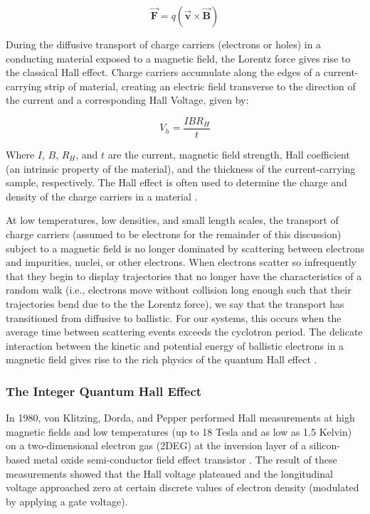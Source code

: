 \begin{equation}
\vec{\mathbf{F}} = q(\vec{\mathbf{v}} \times \vec{\mathbf{B}})
\end{equation}

During the diffusive transport of charge carriers (electrons or holes) in a conducting material exposed to a magnetic field, the Lorentz force gives rise to the classical Hall effect. Charge carriers accumulate along the edges of a current-carrying strip of material, creating an electric field transverse to the direction of the current and a corresponding Hall Voltage, given by:

\begin{equation}
V_{h} = \frac{I B R_{H}}{t}
\end{equation}

Where $I$,  $B$, $R_{H}$, and $t$ are the current, magnetic field strength, Hall coefficient (an intrinsic property of the material), and the thickness of the current-carrying sample, respectively. The Hall effect is often used to determine the charge and density of the charge carriers in a material \cite{Pierret2002}.

At low temperatures, low densities, and small length scales, the transport of charge carriers (assumed to be electrons for the remainder of this discussion) subject to a magnetic field is no longer dominated by scattering between electrons and impurities, nuclei, or other electrons. When electrons scatter so infrequently that they begin to display trajectories that no longer have the characteristics of a random walk (i.e., electrons move without collision long enough such that their trajectories bend due to the the Lorentz force), we say that the transport has transitioned from diffusive to ballistic. For our systems, this occurs when the average time between scattering events exceeds the cyclotron period. The delicate interaction between the kinetic and potential energy of ballistic electrons in a magnetic field gives rise to the rich physics of the quantum Hall effect \cite{Beenakker1991}.

\subsubsection{The Integer Quantum Hall Effect}

In 1980, von Klitzing, Dorda, and Pepper performed Hall measurements at high magnetic fields and low temperatures (up to 18 Tesla and as low as 1.5 Kelvin) on a two-dimensional electron gas (2DEG) at the inversion layer of a silicon-based metal oxide semi-conductor field effect transistor \cite{VonKlitzing1980}. The result of these measurements showed that the Hall voltage plateaued and the longitudinal voltage approached zero at certain discrete values of electron density (modulated by applying a gate voltage).

